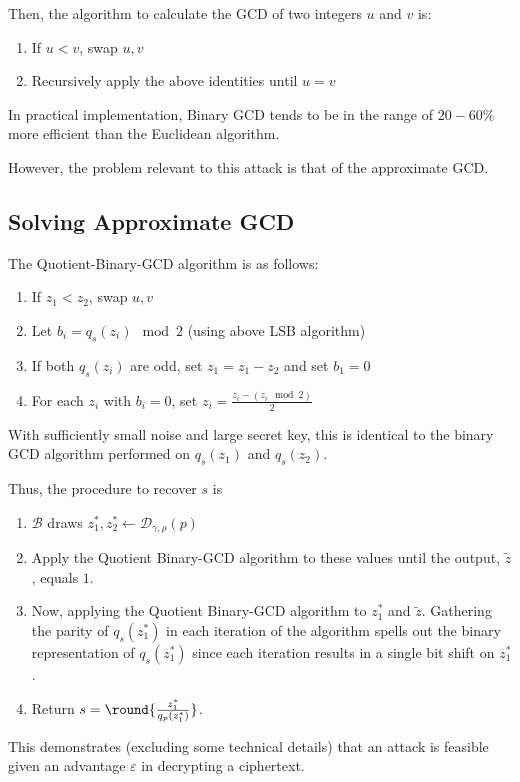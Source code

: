 \documentclass[a4paper,11pt, oneside]{article}
\renewcommand{\D}{\mathcal{D}_{\gamma,\rho}(p)}
\begin{document}
Then, the algorithm to calculate the GCD of two integers $u$ and $v$ is:
\begin{enumerate}
    \item If $u < v$, swap $u,v$
    \item Recursively apply the above identities until $u = v$
\end{enumerate}

In practical implementation, Binary GCD tends to be in the range of $20-60\%$ more efficient than the Euclidean algorithm.

However, the problem relevant to this attack is that of the approximate GCD.

\subsection{Solving Approximate GCD}
The Quotient-Binary-GCD algorithm is as follows:
\begin{enumerate}
    \item If $z_1 < z_2$, swap $u,v$
    \item Let $b_i = q_s(z_i)\mod{2}$  (using above LSB algorithm)
    \item If both $q_s(z_i)$ are odd, set $z_1 = z_1 - z_2$ and set $b_1 = 0$
    \item For each $z_i$ with $b_i = 0$, set $z_i =\frac{z_i - (z_i\mod{2})}{2}$
\end{enumerate}

With sufficiently small noise and large secret key, this is identical to the binary GCD algorithm performed on $q_s(z_1)$ and $q_s(z_2)$.

Thus, the procedure to recover $s$ is
\begin{enumerate}
    \item $\mathcal{B}$ draws $z_1^*,z_2^*\leftarrow \D$ 
    \item Apply the Quotient Binary-GCD algorithm to these values until the output, $\tilde{z}$, equals $1$.
    \item Now, applying the Quotient Binary-GCD algorithm to $z_1^*$ and $\tilde{z}$.  Gathering the parity of $q_s(z_1^*)$ in each iteration of the algorithm spells out the binary representation of $q_s(z_1^*)$ since each iteration results in a single bit shift on $z_1^*$.  
    \item Return $s = \round{\frac{z_1^*}{q_p(z_1^*)}}$.
\end{enumerate}

This demonstrates (excluding some technical details) that an attack is feasible given an advantage $\varepsilon$ in decrypting a ciphertext.
\end{document}
